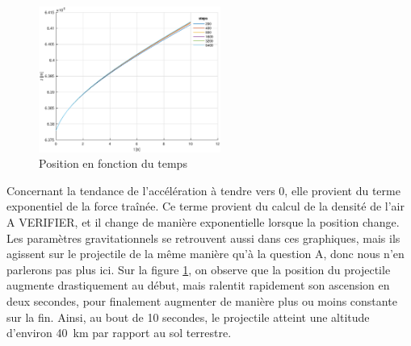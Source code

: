 \documentclass[a4paper,12pt,twoside]{article}
\begin{document}
\begin{figure}[h]
	\centering
	\includegraphics[width=0.53\textwidth]{graphs/zB.eps}
	\caption{Position en fonction du temps}
	\label{fig:B-zt}
\end{figure}

Concernant la tendance de l'accélération à tendre vers 0, elle provient du terme exponentiel de la force traînée. Ce terme provient du calcul de la densité de l'air A VERIFIER, et il change de manière exponentielle lorsque la position change. Les paramètres gravitationnels se retrouvent aussi dans ces graphiques, mais ils agissent sur le projectile de la même manière qu'à la question A, donc nous n'en parlerons pas plus ici.
Sur la figure \ref{fig:B-zt}, on observe que la position du projectile augmente drastiquement au début, mais ralentit rapidement son ascension en deux secondes, pour finalement augmenter de manière plus ou moins constante sur la fin. Ainsi, au bout de 10 secondes, le projectile atteint une altitude d'environ \SI{40}{\kilo\meter} par rapport au sol terrestre.\\
\end{document}
